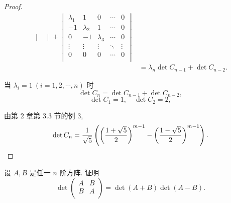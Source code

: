 \documentclass{ctexart}
\begin{document}
\begin{proof}
\begin{align*}
\begin{vmatrix}
    \end{vmatrix}+\begin{vmatrix}
        \lambda_1 & 1 & 0 & \cdots & 0 \\
        -1 & \lambda_2 & 1 & \cdots & 0 \\
        0 & -1 & \lambda_3 & \cdots & 0 \\
        \vdots & \vdots & \vdots & \ddots & \vdots \\
        0 & 0 & 0 & \cdots & 0 \\
    \end{vmatrix} \\
        & =\lambda_n\det C_{n-1}+\det C_{n-2}.
    \end{align*}

    当 $\lambda_i=1\ (i=1,2,\cdots,n)$ 时
    \[\det C_n=\det C_{n-1}+\det C_{n-2},\]
    \[\det C_1=1,\quad\det C_2=2,\]

    由第 2 章第 3.3 节的例 3,
    \[\det C_n=\dfrac{1}{\sqrt{5}}\left(\left(\dfrac{1+\sqrt{5}}{2}\right)^{m-1}-\left(\dfrac{1-\sqrt{5}}{2}\right)^{m-1}\right).\qedhere\]
\end{proof}
\begin{exercise}%
    设 $A,B$ 是任一 $n$ 阶方阵. 证明
    \[\det\begin{pmatrix}
        A & B \\
        B & A \\
    \end{pmatrix}=\det(A+B)\det(A-B).\]
\end{exercise}
\end{document}
